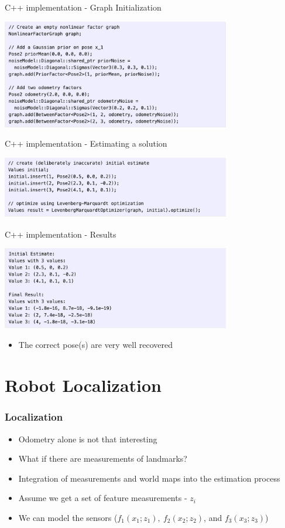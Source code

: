 \documentclass[10pt]{beamer}
\begin{document}
\begin{frame}{C++ implementation - Graph Initialization}
  \centerline{\includegraphics[width=10cm]{odometry-c++.png}}
\end{frame}

\begin{frame}{C++ implementation - Estimating a solution}
  \centerline{\includegraphics[width=10cm]{odometry-values.png}}
\end{frame}

\begin{frame}{C++ implementation - Results}
  \centerline{\includegraphics[width=10cm]{odometry-result.png}}
  \begin{itemize}
    \item The correct pose(s) are very well recovered
  \end{itemize}
\end{frame}

\section{Robot Localization}

\begin{frame}
  \frametitle{Localization}
  \begin{itemize}
    \item Odometry alone is not that interesting
    \item What if there are measurements of landmarks?
    \item Integration of measurements and world maps into the estimation process
    \item Assume we get a set of feature measurements - $z_i$
    \item We can model the sensors ($f_1(x_1; z_1),~ f_2(x_2; z_2)$, and $f_3(x_3; z_3)$)
  \end{itemize}
\end{frame}
\end{document}
